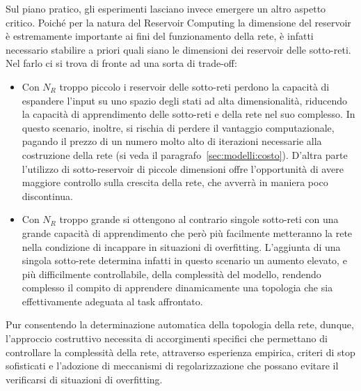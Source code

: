 Sul piano pratico, gli esperimenti lasciano invece emergere un altro aspetto critico. Poiché per la natura del Reservoir Computing la dimensione del reservoir è estremamente importante ai fini del funzionamento della rete, è infatti necessario stabilire a priori quali siano le dimensioni dei reservoir delle sotto-reti. Nel farlo ci si trova di fronte ad una sorta di trade-off:
\begin{itemize}
\item Con $N_R$ troppo piccolo i reservoir delle sotto-reti perdono la capacità di espandere l'input su uno spazio degli stati ad alta dimensionalità, riducendo la capacità di apprendimento delle sotto-reti e della rete nel suo complesso. In questo scenario, inoltre, si rischia di perdere il vantaggio computazionale, pagando il prezzo di un numero molto alto di iterazioni necessarie alla costruzione della rete (si veda il paragrafo~\vref{sec:modelli:costo}). D'altra parte l'utilizzo di sotto-reservoir di piccole dimensioni offre l'opportunità di avere maggiore controllo sulla crescita della rete, che avverrà in maniera poco discontinua.
\item Con $N_R$ troppo grande si ottengono al contrario singole sotto-reti con una grande capacità di apprendimento che però più facilmente metteranno la rete nella condizione di incappare in situazioni di overfitting. L'aggiunta di una singola sotto-rete determina infatti in questo scenario un aumento elevato, e più difficilmente controllabile, della complessità del modello, rendendo complesso il compito di  apprendere dinamicamente una topologia che sia effettivamente adeguata al task affrontato.
\end{itemize}
Pur consentendo la determinazione automatica della topologia della rete, dunque, l'approccio costruttivo necessita di accorgimenti specifici che permettano di controllare la complessità della rete, attraverso esperienza empirica, criteri di stop sofisticati e l'adozione di meccanismi di regolarizzazione che possano evitare il verificarsi di situazioni di overfitting.














